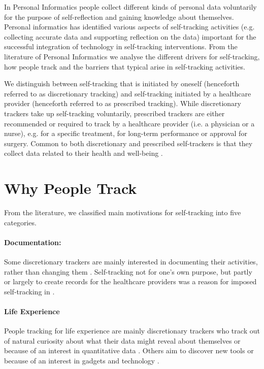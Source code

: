 In Personal Informatics people collect different kinds of personal data voluntarily for the purpose of self-reflection and gaining knowledge about themselves. Personal informatics has identified various aspects of self-tracking activities (e.g. collecting accurate data and supporting reflection on the data) important for the successful integration of technology in self-tracking interventions. From the literature of Personal Informatics we analyse the different drivers for self-tracking, how people track and the barriers that typical arise in self-tracking activities.


We distinguish between self-tracking that is initiated by oneself (henceforth referred to as discretionary tracking) and self-tracking initiated by a healthcare provider (henceforth referred to as prescribed tracking). While discretionary trackers take up self-tracking voluntarily, prescribed trackers are either recommended or required to track by a healthcare provider (i.e. a physician or a nurse), e.g. for a specific treatment, for long-term performance or approval for surgery. Common to both discretionary and prescribed self-trackers is that they collect data related to their health and well-being \citep{Choe2014, MacLeod2014, Chung2016}.


\section{Why People Track} 
From the literature, we classified main motivations for self-tracking into five categories.

\paragraph{Documentation:}
Some discretionary trackers are mainly interested in documenting their activities, rather than changing them \citep{Rooksby2014}. Self-tracking not for one's own purpose, but partly or largely to create records for the healthcare providers was a reason for imposed self-tracking in \citep{Ancker2015}. 

\paragraph{Life Experience} 
People tracking for life experience are mainly discretionary trackers who track out of natural curiosity about what their data might reveal about themselves \citep{Li2010, Epstein2015} or because of an interest in quantitative data \citep{Li2010, Rooksby2014}. Others aim to discover new tools or because of an interest in gadgets and technology \citep{Li2010, Rooksby2014}. 

